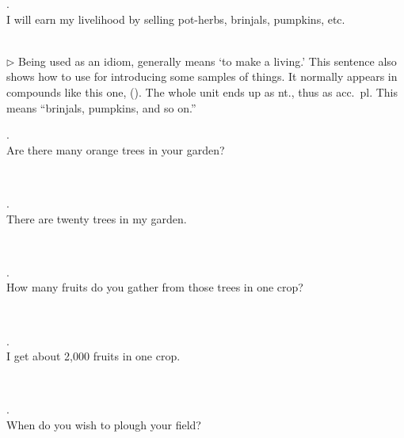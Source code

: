 \medskip
\parbox[lt]{0.93\linewidth}{\raggedright{}. \\
\hspace*{6mm}I will earn my livelihood by selling pot-herbs, brinjals, pumpkins, etc.}\\[1mm]
{\small $\triangleright$ Being used as an idiom,  generally means `to make a living.' This sentence also shows how to use  for introducing some samples of things. It normally appears in compounds like this one,  (). The whole unit ends up as nt., thus  as acc.\ pl. This means ``brinjals, pumpkins, and so on.''}

\medskip
\parbox[lt]{0.93\linewidth}{\raggedright{}. \\
\hspace*{6mm}Are there many orange trees in your garden?}\\[1mm]

\medskip
\parbox[lt]{0.93\linewidth}{\raggedright{}. \\
\hspace*{6mm}There are twenty trees in my garden.}\\[1mm]

\medskip
\parbox[lt]{0.93\linewidth}{\raggedright{}. \\
\hspace*{6mm}How many fruits do you gather from those trees in one crop?}\\[1mm]

\medskip
\parbox[lt]{0.93\linewidth}{\raggedright{}. \\
\hspace*{6mm}I get about 2,000 fruits in one crop.}\\[1mm]

\medskip
\parbox[lt]{0.93\linewidth}{\raggedright{}. \\
\hspace*{6mm}When do you wish to plough your field?}\\[1mm]


